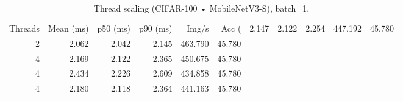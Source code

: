 \begin{table}
\caption{Thread scaling (CIFAR-100 • MobileNetV3-S), batch=1.}
\label{tab:threads_cifar100_mobilenet_v3_small}
\begin{tabular}{rrrrrr}
\toprule
Threads & Mean (ms) & p50 (ms) & p90 (ms) & Img/s & Acc (%
 & 2.147 & 2.122 & 2.254 & 447.192 & 45.780 \\
2 & 2.062 & 2.042 & 2.145 & 463.790 & 45.780 \\
4 & 2.169 & 2.122 & 2.365 & 450.675 & 45.780 \\
4 & 2.434 & 2.226 & 2.609 & 434.858 & 45.780 \\
4 & 2.180 & 2.118 & 2.364 & 441.163 & 45.780 \\
\bottomrule
\end{tabular}
\end{table}
